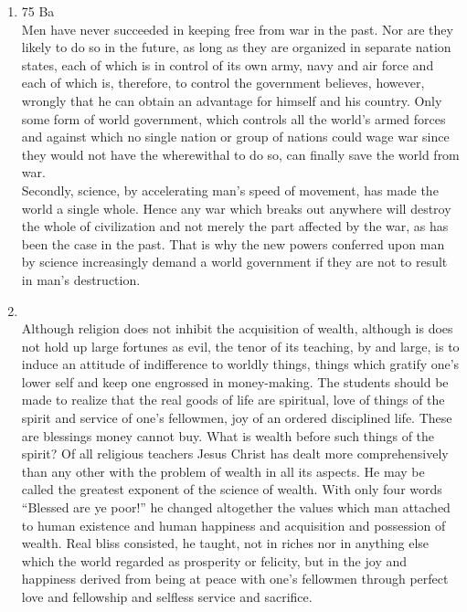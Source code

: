 \documentclass[12pt]{article}
\begin{document}
\begin{enumerate}
    \item 75 Ba\\
      Men have never succeeded in keeping free from war in the past. Nor are they likely to do so in the future, as long as they are organized in separate nation states, each of which is in control of its own army, navy and air force and each of which is, therefore, to control the government believes, however, wrongly that he can obtain an advantage for himself and his country. Only some form of world government, which controls all the world’s armed forces and against which no single nation or group of nations could wage war since they would not have the wherewithal to do so, can finally save the world from war.\\
      Secondly, science, by accelerating man’s speed of movement, has made the world a single whole. Hence any war which breaks out anywhere will destroy the whole of civilization and not merely the part affected by the war, as has been the case in the past. That is why the new powers conferred upon man by science increasingly demand a world government if they are not to result in man’s destruction.

    \item {}\\
      Although religion does not inhibit the acquisition of wealth, although is does not hold up large fortunes as evil, the tenor of its teaching, by and large, is to induce an attitude of indifference to worldly things, things which gratify one’s lower self and keep one engrossed in money-making. The students should be made to realize that the real goods of life are spiritual, love of things of the spirit and service of one’s fellowmen, joy of an ordered disciplined life. These are blessings money cannot buy. What is wealth before such things of the spirit? Of all religious teachers Jesus Christ has dealt more comprehensively than any other with the problem of wealth in all its aspects. He may be called the greatest exponent of the science of wealth. With only four words “Blessed are ye poor!” he changed altogether the values which man attached to human existence and human happiness and acquisition and possession of wealth. Real bliss consisted, he taught, not in riches nor in anything else which the world regarded as prosperity or felicity, but in the joy and happiness derived from being at peace with one’s fellowmen through perfect love and fellowship and selfless service and sacrifice.\\


\end{enumerate}
\end{document}
